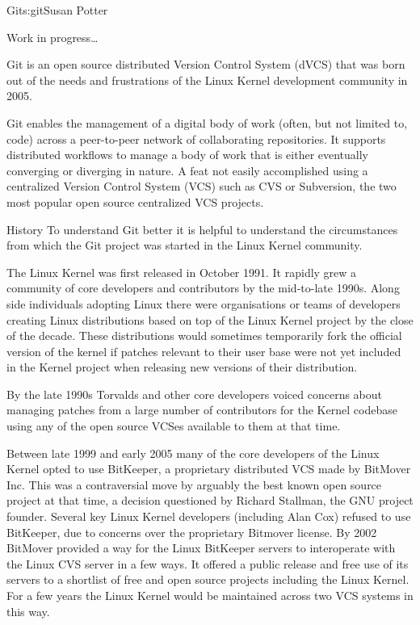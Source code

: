 \begin{aosachapter}{Git}{s:git}{Susan Potter}

Work in progress\ldots

Git is an open source distributed Version Control System (dVCS) that was
born out of the needs and frustrations of the Linux Kernel development
community in 2005.

Git enables the management of a digital body of work (often,
but not limited to, code) across a peer-to-peer network of
collaborating repositories. It supports distributed workflows to
manage a body of work that is either eventually converging or
diverging in nature. A feat not easily accomplished
using a centralized Version Control System (VCS) such as CVS or
Subversion, the two most popular open source centralized VCS
projects.

\begin{aosasect1}{History}
To understand Git better it is helpful to understand the circumstances
from which the Git project was started in the Linux Kernel community.

The Linux Kernel was first released in October 1991. It rapidly grew a community
of core developers and contributors by the mid-to-late 1990s. Along side
individuals adopting Linux there were organisations or teams of developers
creating Linux distributions based on top of the Linux Kernel project by
the close of the decade. These distributions would sometimes temporarily
fork the official version of the kernel if patches relevant to their user
base were not yet included in the Kernel project when releasing new
versions of their distribution.

By the late 1990s Torvalds and other core developers voiced concerns
about managing patches from a large number of contributors for the
Kernel codebase using any of the open source VCSes available to them at
that time.

Between late 1999 and early 2005 many of the core developers of the Linux
Kernel opted to use BitKeeper, a proprietary distributed VCS made by
BitMover Inc. This was a contraversial move by arguably the best known open
source project at that time, a decision questioned by Richard Stallman, the
GNU project founder. Several key Linux Kernel developers (including Alan Cox)
refused to use BitKeeper, due to concerns over the proprietary Bitmover
license. By 2002 BitMover provided a way for the Linux BitKeeper servers to
interoperate with the Linux CVS server in a few ways. It offered a
public release and free use of its servers to a shortlist of free and
open source projects including the Linux Kernel. For a few years the
Linux Kernel would be maintained across two VCS systems in this way.


\end{aosasect1}
\end{aosachapter}
